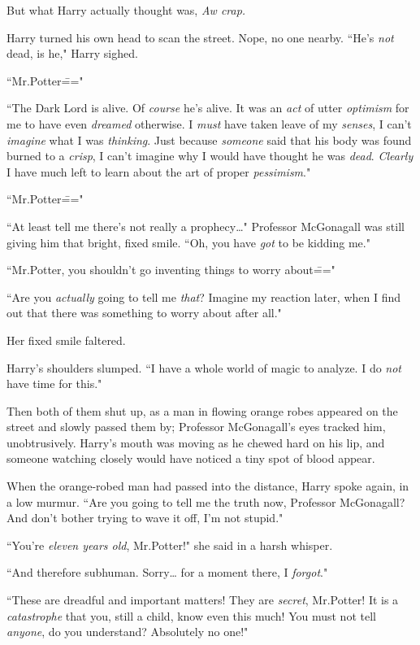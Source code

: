 But what Harry actually thought was, \emph{Aw crap.}

Harry turned his own head to scan the street. Nope, no one nearby. ``He's \emph{not} dead, is he," Harry sighed.

``Mr.\?Potter\==="

``The Dark Lord is alive. Of \emph{course} he's alive. It was an \emph{act} of utter \emph{optimism} for me to have even \emph{dreamed} otherwise. I \emph{must} have taken leave of my \emph{senses}, I can't \emph{imagine} what I was \emph{thinking}. Just because \emph{someone} said that his body was found burned to a \emph{crisp}, I can't imagine why I would have thought he was \emph{dead}. \emph{Clearly} I have much left to learn about the art of proper \emph{pessimism}."

``Mr.\?Potter\==="

``At least tell me there's not really a prophecy{\ldots}" Professor McGonagall was still giving him that bright, fixed smile. ``Oh, you have \emph{got} to be kidding me."

``Mr.\?Potter, you shouldn't go inventing things to worry about\==="

``Are you \emph{actually} going to tell me \emph{that}? Imagine my reaction later, when I find out that there was something to worry about after all."

Her fixed smile faltered.

Harry's shoulders slumped. ``I have a whole world of magic to analyze. I do \emph{not} have time for this."

Then both of them shut up, as a man in flowing orange robes appeared on the street and slowly passed them by; Professor McGonagall's eyes tracked him, unobtrusively. Harry's mouth was moving as he chewed hard on his lip, and someone watching closely would have noticed a tiny spot of blood appear.

When the orange-robed man had passed into the distance, Harry spoke again, in a low murmur. ``Are you going to tell me the truth now, Professor McGonagall? And don't bother trying to wave it off, I'm not stupid."

``You're \emph{eleven years old}, Mr.\?Potter!" she said in a harsh whisper.

``And therefore subhuman. Sorry{\ldots} for a moment there, I \emph{forgot}."

``These are dreadful and important matters! They are \emph{secret}, Mr.\?Potter! It is a \emph{catastrophe} that you, still a child, know even this much! You must not tell \emph{anyone}, do you understand? Absolutely no one!"

